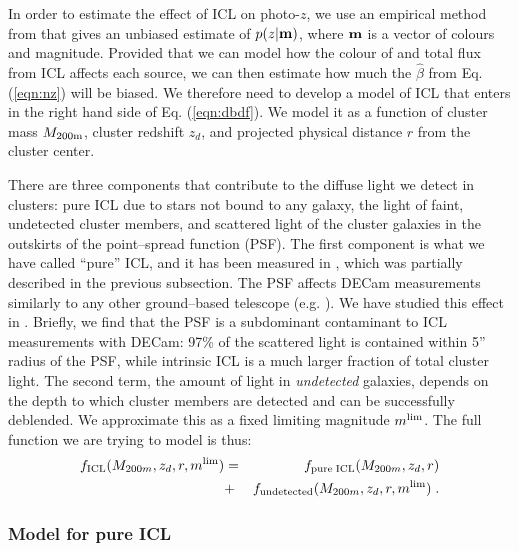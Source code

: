 {In order to estimate the effect of ICL on photo-$z$, we use an empirical method from \citet{2016arXiv161001160G} that gives an unbiased estimate of $p(z|{\bf m})$, where ${\bf m}$ is a vector of colours and magnitude. Provided that we can model how the colour of and total flux from ICL affects each source, we can then estimate how much the $\hat{\beta}$ from Eq. (\ref{eqn:nz}) will be biased. We therefore need to develop a model of ICL that enters in the right hand side of Eq. (\ref{eqn:dbdf}). We model it as a function of cluster mass $M_{\rm 200m}$, cluster redshift $z_{d}$, and projected physical distance $r$ from the cluster center.

There are three components that contribute to the diffuse light we detect in clusters: pure ICL due to stars not bound to any galaxy, the light of faint, undetected cluster members, and scattered light of the cluster galaxies in the outskirts of the point--spread function (PSF). The first component is what we have called ``pure'' ICL, and it has been measured in \citet{icl}, which was partially described in the previous subsection. The PSF affects DECam measurements similarly to any other ground--based telescope (e.g. \citealt{1969A&A.....3..455M, 1971PASP...83..199K, 1996PASP..108..699R,2007ApJ...666..663B, 2014A&A...567A..97S}). We have studied this effect in \citet{icl}. Briefly, we find that the PSF is a subdominant contaminant to ICL measurements with DECam: 97\% of the scattered light is contained within 5'' radius of the PSF, while intrinsic ICL is a much larger fraction of total cluster light. The second term, the amount of light in \emph{undetected} galaxies, depends on the depth to which cluster members are detected and can be successfully deblended. We approximate this as a fixed limiting magnitude $m^{\rm lim}$. The full function we are trying to model is thus:
\begin{eqnarray}
\label{eqn:fmodel}
f_{\rm ICL}(M_{200m}, z_{d}, r, m^{\rm lim}) &=& f_{\rm pure\; ICL}(M_{200m}, z_{d}, r) \nonumber \\ &+& f_{\rm undetected}(M_{200m}, z_{d}, r, m^{\rm lim}) \; . \nonumber \\
\end{eqnarray}

\subsubsection{Model for pure ICL}

}
